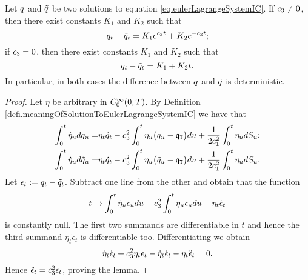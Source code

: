 \documentclass[10pt,a4paper]{article}
\begin{document}
\begin{lemma}
\label{lemma.twoSolutionsEulerLagrangeIC}
Let $q$ and $\tilde{q}$ be two solutions to equation \eqref{eq.eulerLagrangeSystemIC}. If $c_{3} \neq 0 $, then there exist constants $K_1$ and $K_2$ such that 
\begin{equation*}
q_t - \tilde{q}_t = K_1 e^{c_{3} t } + K_2 e^{-c_{3} t};
\end{equation*}
if $c_{3}=0$, then there exist constants $K_1$ and $K_2$ such that 
\begin{equation*}
q_t - \tilde{q}_t = K_1  + K_2 t.
\end{equation*}
In particular, in both cases the difference between $q$  and $\tilde{q}$ is deterministic. 
\end{lemma}
\begin{proof}
Let $\eta$ be arbitrary in $C^{\infty}_{0}(0,T)$. By Definition \ref{defi.meaningOfSolutionToEulerLagrangeSystemIC} we have that 
\begin{equation*}
\begin{split}
\int_{0}^{t} \dot{\eta}_u dq_u 
=& \eta_t \dot{q}_{t}  
 - c_{3}^{2} 	\int_{0}^{t} \eta_u \big(q_u  - \mathfrak{q}_{\mathtt{T} }\big) du 
+ \frac{1}{2c_{1}^{2}} 	\int_{0}^{t} \eta_{u} dS_u ; \\
\int_{0}^{t} \dot{\eta}_u d\tilde{q}_u 
=& \eta_t \dot{q}_{t}  
 - c_{3}^{2} 	\int_{0}^{t} \eta_u \big(\tilde{q}_u  - \mathfrak{q}_{\mathtt{T} }\big) du 
+ \frac{1}{2c_{1}^{2}} 	\int_{0}^{t} \eta_{u} dS_u .
\end{split}
\end{equation*}
Let $\epsilon_t:= q_t - \tilde{q}_t$. Subtract one line from the other and obtain that the function 
\begin{equation*}
t\mapsto \int_{0}^{t} \dot{\eta}_u \dot{\epsilon}_u du + c_{3}^{2} \int_{0}^{t} \eta_u \epsilon_u du - \eta_t \dot{\epsilon}_t 
\end{equation*}
is constantly null. The first two summands are differentiable in $t$ and hence the third summand $ \eta_t \dot{\epsilon}_t $ is differentiable too. Differentiating we obtain
\begin{equation*}
 \dot{\eta}_t \dot{\epsilon}_t + c_{3}^{2} \eta_t \epsilon_t - \dot{\eta}_t \dot{\epsilon}_t  - \eta_t \ddot{\epsilon}_t = 0.
\end{equation*}
Hence $\ddot{\epsilon}_t = c_{3}^{2} \epsilon_t$, proving the lemma. 
\end{proof}
\end{document}
